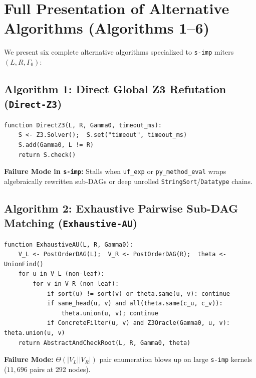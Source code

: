 \documentclass[11pt,a4paper]{article}
\begin{document}
\section{Full Presentation of Alternative Algorithms (Algorithms 1--6)}
\label{sec:alternatives}

We present six complete alternative algorithms specialized to \texttt{s-imp} miters $(L, R, \Gamma_0)$:

\subsection{Algorithm 1: Direct Global Z3 Refutation (\texttt{Direct-Z3})}
\begin{lstlisting}[caption={Algorithm 1: Monolithic Global Z3 Refutation (\texttt{Direct-Z3}).}]
function DirectZ3(L, R, Gamma0, timeout_ms):
    S <- Z3.Solver();  S.set("timeout", timeout_ms)
    S.add(Gamma0, L != R)
    return S.check()
\end{lstlisting}
\textbf{Failure Mode in \texttt{s-imp}:} Stalls when \texttt{uf\_exp} or \texttt{py\_method\_eval} wraps algebraically rewritten sub-DAGs or deep unrolled \texttt{StringSort}/\texttt{Datatype} chains.

\subsection{Algorithm 2: Exhaustive Pairwise Sub-DAG Matching (\texttt{Exhaustive-AU})}
\begin{lstlisting}[caption={Algorithm 2: Exhaustive Bottom-Up Pairwise Sub-DAG Matching (\texttt{Exhaustive-AU}).}]
function ExhaustiveAU(L, R, Gamma0):
    V_L <- PostOrderDAG(L);  V_R <- PostOrderDAG(R);  theta <- UnionFind()
    for u in V_L (non-leaf):
        for v in V_R (non-leaf):
            if sort(u) != sort(v) or theta.same(u, v): continue
            if same_head(u, v) and all(theta.same(c_u, c_v)):
                theta.union(u, v); continue
            if ConcreteFilter(u, v) and Z3Oracle(Gamma0, u, v): theta.union(u, v)
    return AbstractAndCheckRoot(L, R, Gamma0, theta)
\end{lstlisting}
\textbf{Failure Mode:} $\Theta(|V_L||V_R|)$ pair enumeration blows up on large \texttt{s-imp} kernels ($11{,}696$ pairs at 292 nodes).
\end{document}
